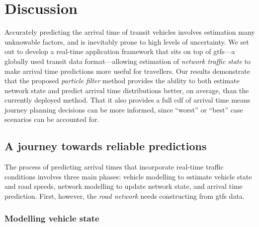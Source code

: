 \chapter{Discussion}
\label{cha:discussion}


Accurately predicting the arrival time of transit vehicles involves estimation many unknowable factors, and is inevitably prone to high levels of uncertainty.
We set out to develop a real-time application framework that sits on top of \gls{gtfs}---a globally used transit data format---allowing estimation of \emph{network traffic state} to make arrival time predictions more useful for travellers. Our results demonstrate that the proposed \emph{particle filter} method provides the ability to both estimate network state and predict arrival time distributions better, on average, than the currently deployed method. That it also provides a full \gls{cdf} of arrival time means journey planning decisions can be more informed, since ``worst'' or ``best'' case scenarios can be accounted for.


\section{A journey towards reliable predictions}

The process of predicting arrival times that incorporate real-time traffic conditions involves three main phases: vehicle modelling to estimate vehicle state and road speeds, network modelling to update network state, and arrival time prediction. First, however, the \emph{road network} needs constructing from \gls{gtfs} data.


\subsection{Modelling vehicle state}

